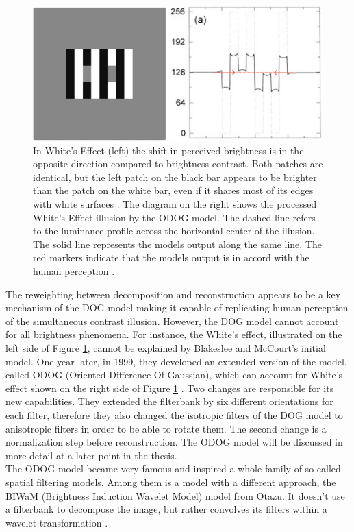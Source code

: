 \newpage

\begin{figure}[H]
    \centering
    \includegraphics[width=0.7\linewidth]{media/whites_effect_model.png}
    \begin{minipage}{0.8\textwidth}
    \caption{In White's Effect (left) the shift in perceived brightness is in the opposite
    direction compared to brightness contrast. Both patches are identical, but the left
    patch on the black bar appears to be brighter than the patch on the white bar, even if
    it shares most of its edges with white surfaces \parencite{Whit1979}. The diagram on
    the right shows the processed White's Effect illusion by the ODOG model. The dashed
    line refers to the luminance profile across the horizontal center of the illusion. The
    solid line represents the models output along the same line. The red markers indicate
    that the models output is in accord with the human perception
    \parencite{Blakeslee1999}.}
    \label{fig:figure6}
    \end{minipage}
\end{figure}

The reweighting between decomposition and reconstruction appears to be a key mechanism of
the DOG model making it capable of replicating human perception of the simultaneous
contrast illusion. However, the DOG model cannot account for all brightness phenomena. For
instance, the White's effect, illustrated on the left side of Figure \ref{fig:figure6},
cannot be explained by Blakeslee and McCourt's initial model. One year later, in 1999,
they developed an extended version of the model, called ODOG (Oriented Difference Of
Gaussian), which can account for White's effect shown on the right side of Figure
\ref{fig:figure6} \parencite{Blakeslee1999}. Two changes are responsible for its new
capabilities. They extended the filterbank by six different orientations for each filter,
therefore they also changed the isotropic filters of the DOG model to anisotropic filters
in order to be able to rotate them. The second change is a normalization step before
reconstruction. The ODOG model will be discussed in more detail at a later point in the
thesis. \\
The ODOG model became very famous and inspired a whole family of so-called spatial
filtering models. Among them is a model with a different approach, the BIWaM (Brightness
Induction Wavelet Model) model from Otazu. It doesn't use a filterbank to decompose the
image, but rather convolves its filters within a wavelet transformation
\parencite{Otazu2008}.


